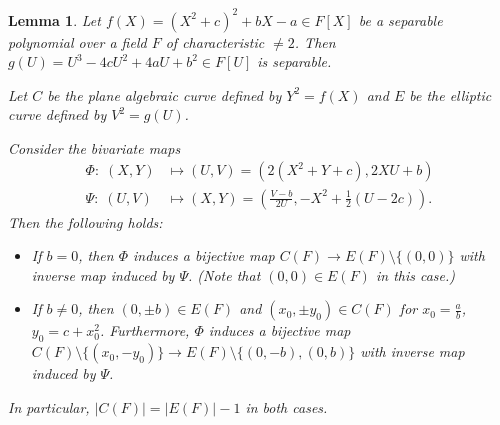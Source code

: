 \documentclass[12pt]{amsart}
\theoremstyle{plain}
\newtheorem{lemma}[theorem]{Lemma}
\theoremstyle{definition}
\numberwithin{equation}{section}
\newcommand{\abs}[1]{\lvert#1\rvert}
\newcommand*{\set}[1]{\{#1\}}
\begin{document}
\begin{lemma}
  Let $f(X)=(X^2+c)^2 + bX - a\in F[X]$ be a separable polynomial over
  a field $F$ of characteristic $\ne2$. Then $g(U)=U^3 -4cU^2 + 4aU +
  b^2\in F[U]$ is separable.

  Let $C$ be the plane algebraic curve defined by $Y^2=f(X)$ and $E$ be
  the elliptic curve defined by $V^2=g(U)$.

  Consider the bivariate maps
  \begin{align*}
    \Phi:\;(X, Y) &\mapsto (U, V)=(2(X^2 + Y +c), 2XU + b)\\
    \Psi:\;(U, V) &\mapsto (X, Y)=\left(\frac{V - b}{2 U}, -X^{2}%
                    + \frac{1}{2}(U-2c)\right).
  \end{align*}
  Then the following holds:
  \begin{itemize}
  \item[(a)] If $b=0$, then $\Phi$ induces a bijective map
    $C(F)\to E(F)\setminus\set{(0, 0)}$ with inverse map induced by
    $\Psi$. (Note that $(0, 0)\in E(F)$ in this case.)
  \item[(b)] If $b\ne0$, then $(0,\pm b)\in E(F)$ and
    $(x_0, \pm y_0)\in C(F)$ for $x_0=\frac{a}{b}$,
    $y_0=c+x_0^2$. Furthermore, $\Phi$ induces a bijective map
    $C(F)\setminus\set{(x_0,-y_0)}\to E(F)\setminus\set{(0, -b), (0,
      b)}$ with inverse map induced by $\Psi$.
  \end{itemize}

  In particular, $\abs{C(F)}=\abs{E(F)}-1$ in both cases.
\end{lemma}
\end{document}

